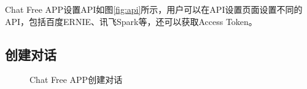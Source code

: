 \documentclass{article}
\begin{document}
Chat Free APP设置API如图\ref{fig:api}所示，用户可以在API设置页面设置不同的API，包括百度ERNIE、讯飞Spark等，还可以获取Access Token。

\newpage
\subsection{创建对话}

\begin{figure}[h]
    \centering
    \caption{Chat Free APP创建对话}
    \label{fig:chat}
\end{figure}
\end{document}
